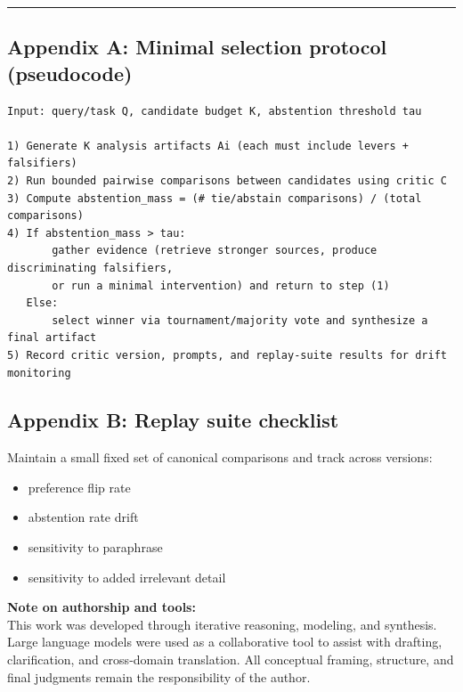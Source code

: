 \documentclass[11pt]{article}
\providecommand{\tightlist}{%
  \setlength{\itemsep}{0pt}\setlength{\parskip}{0pt}}
\begin{document}
\begin{center}\rule{0.5\linewidth}{0.5pt}\end{center}

\hypertarget{appendix-a}{%
\subsection{Appendix A: Minimal selection protocol (pseudocode)}\label{appendix-a}}

\begin{verbatim}
Input: query/task Q, candidate budget K, abstention threshold tau

1) Generate K analysis artifacts Ai (each must include levers + falsifiers)
2) Run bounded pairwise comparisons between candidates using critic C
3) Compute abstention_mass = (# tie/abstain comparisons) / (total comparisons)
4) If abstention_mass > tau:
       gather evidence (retrieve stronger sources, produce discriminating falsifiers,
       or run a minimal intervention) and return to step (1)
   Else:
       select winner via tournament/majority vote and synthesize a final artifact
5) Record critic version, prompts, and replay-suite results for drift monitoring
\end{verbatim}

\hypertarget{appendix-b}{%
\subsection{Appendix B: Replay suite checklist}\label{appendix-b}}

Maintain a small fixed set of canonical comparisons and track across versions:

\begin{itemize}
\tightlist
\item preference flip rate
\item abstention rate drift
\item sensitivity to paraphrase
\item sensitivity to added irrelevant detail
\end{itemize}

\newpage

{
\noindent\textbf{Note on authorship and tools:}\\
This work was developed through iterative reasoning, modeling, and synthesis.
Large language models were used as a collaborative tool to assist with drafting,
clarification, and cross-domain translation. All conceptual framing, structure,
and final judgments remain the responsibility of the author.
}
\end{document}
